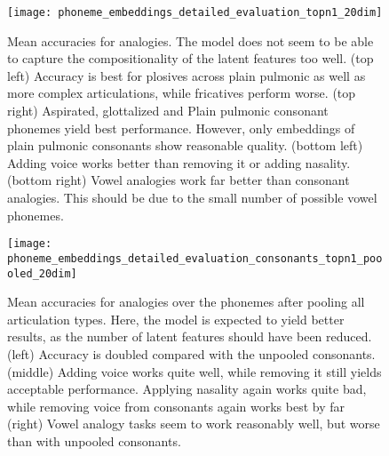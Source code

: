 \documentclass[6pt]{article}
\begin{document}
\begin{figure}[] %
   \centering
   \texttt{[image: phoneme\_embeddings\_detailed\_evaluation\_topn1\_20dim]} 
   \caption{Mean accuracies for analogies. The model does not seem to be able to capture the compositionality of the latent features too well. (top left) Accuracy is best for plosives across plain pulmonic as well as more complex articulations, while fricatives perform worse. (top right) Aspirated, glottalized and Plain pulmonic consonant phonemes yield best performance. However, only embeddings of plain pulmonic consonants show reasonable quality. (bottom left) Adding voice works better than removing it or adding nasality. (bottom right) Vowel analogies work far better than consonant analogies. This should be due to the small number of possible vowel phonemes.}
   \label{fig:phoneme_embeddings_detailed_evaluation_topn1}
\end{figure}

\begin{figure}[] %
   \centering
   \texttt{[image: phoneme\_embeddings\_detailed\_evaluation\_consonants\_topn1\_poooled\_20dim]} 
   \caption{Mean accuracies for analogies over the phonemes after pooling all articulation types. Here, the model is expected to yield better results, as the number of latent features should have been reduced. (left) Accuracy is doubled compared with the unpooled consonants. (middle) Adding voice works quite well, while removing it still yields acceptable performance. Applying nasality again works quite bad, while removing voice from consonants again works best by far (right) Vowel analogy tasks seem to work reasonably well, but worse than with unpooled consonants.}
   \label{fig:phoneme_embeddings_detailed_evaluation_topn1_poooled}
\end{figure}
\end{document}
